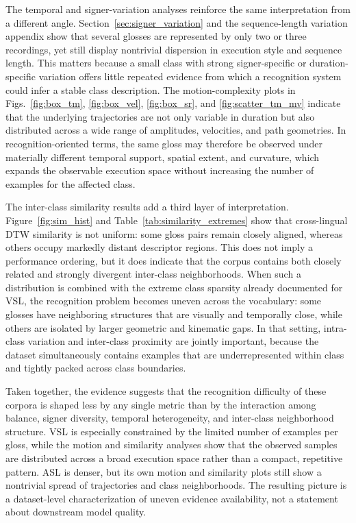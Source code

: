 \documentclass{ieeeaccess}
\begin{document}
The temporal and signer-variation analyses reinforce the same interpretation from a different angle. Section~\ref{sec:signer_variation} and the sequence-length variation appendix show that several glosses are represented by only two or three recordings, yet still display nontrivial dispersion in execution style and sequence length. This matters because a small class with strong signer-specific or duration-specific variation offers little repeated evidence from which a recognition system could infer a stable class description. The motion-complexity plots in Figs.~\ref{fig:box_tm}, \ref{fig:box_vel}, \ref{fig:box_sr}, and \ref{fig:scatter_tm_mv} indicate that the underlying trajectories are not only variable in duration but also distributed across a wide range of amplitudes, velocities, and path geometries. In recognition-oriented terms, the same gloss may therefore be observed under materially different temporal support, spatial extent, and curvature, which expands the observable execution space without increasing the number of examples for the affected class.

The inter-class similarity results add a third layer of interpretation. Figure~\ref{fig:sim_hist} and Table~\ref{tab:similarity_extremes} show that cross-lingual DTW similarity is not uniform: some gloss pairs remain closely aligned, whereas others occupy markedly distant descriptor regions. This does not imply a performance ordering, but it does indicate that the corpus contains both closely related and strongly divergent inter-class neighborhoods. When such a distribution is combined with the extreme class sparsity already documented for VSL, the recognition problem becomes uneven across the vocabulary: some glosses have neighboring structures that are visually and temporally close, while others are isolated by larger geometric and kinematic gaps. In that setting, intra-class variation and inter-class proximity are jointly important, because the dataset simultaneously contains examples that are underrepresented within class and tightly packed across class boundaries.

Taken together, the evidence suggests that the recognition difficulty of these corpora is shaped less by any single metric than by the interaction among balance, signer diversity, temporal heterogeneity, and inter-class neighborhood structure. VSL is especially constrained by the limited number of examples per gloss, while the motion and similarity analyses show that the observed samples are distributed across a broad execution space rather than a compact, repetitive pattern. ASL is denser, but its own motion and similarity plots still show a nontrivial spread of trajectories and class neighborhoods. The resulting picture is a dataset-level characterization of uneven evidence availability, not a statement about downstream model quality.
\end{document}
